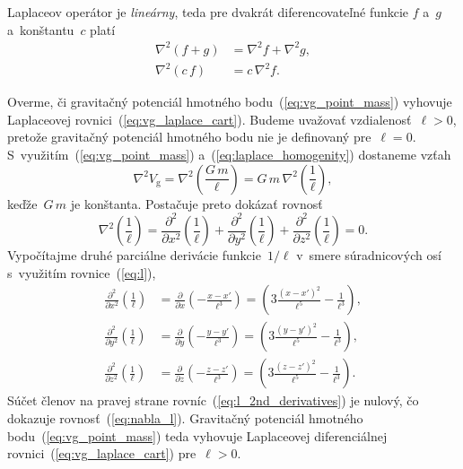 \documentclass[a4paper, 12pt]{book}
\newcommand{\gidx}{\mathrm g}
\begin{document}
Laplaceov operátor je \emph{lineárny}, teda pre dvakrát diferencovateľné 
funkcie $f$ a~$g$ a~konštantu~$c$ platí
%
\begin{align}
\label{eq:laplace_additivity}
\nabla^2 \left(f + g \right) &= \nabla^2 f + \nabla^2 g{,}\\
%
\label{eq:laplace_homogenity}
\nabla^2 (c \, f) &= c \, \nabla^2 f{.}
\end{align}

Overme, či gravitačný potenciál hmotného bodu~(\ref{eq:vg_point_mass}) vyhovuje 
Laplaceovej rovnici~(\ref{eq:vg_laplace_cart}).  Budeme uvažovať 
vzdialenosť~$\ell > 0$, pretože gravitačný potenciál hmotného bodu nie je 
definovaný pre~$\ell = 0$.  S~využitím~(\ref{eq:vg_point_mass}) 
a~(\ref{eq:laplace_homogenity}) dostaneme vzťah
%
\begin{equation}
\nabla^2 V_\gidx = \nabla^2 \left( \frac{G \, m}{\ell} \right) = G \, m \, 
\nabla^2 \left( \frac{1}{\ell} \right){,}
\end{equation}
%
keďže~$G \, m$ je konštanta.  Postačuje preto dokázať rovnosť
%
\begin{equation}
\label{eq:nabla_l}
\nabla^2 \left( \frac{1}{\ell} \right) = \frac{\partial^2}{\partial x^2}\left( 
\frac{1}{\ell} \right) + \frac{\partial^2}{\partial y^2}\left( \frac{1}{\ell} 
\right) + \frac{\partial^2}{\partial z^2}\left( \frac{1}{\ell} \right) = 0{.}
\end{equation}
%
Vypočítajme druhé parciálne derivácie funkcie~$1 \slash \ell$ v~smere 
súradnicových osí s~využitím rovnice~(\ref{eq:l}),
%
\begin{equation}
\label{eq:l_2nd_derivatives}
\begin{split}
\frac{\partial^2}{\partial x^2} \left( \frac{1}{\ell} \right) &=
\frac{\partial}{\partial x} \left( -\frac{x - x'}{\ell^3} \right) = \left(3
\frac{(x - x')^2}{\ell^5} - \frac{1}{\ell^3} \right){,}\\
%
\frac{\partial^2}{\partial y^2} \left( \frac{1}{\ell} \right) &=
\frac{\partial}{\partial y} \left( -\frac{y - y'}{\ell^3} \right) = \left(3
\frac{(y - y')^2}{\ell^5} - \frac{1}{\ell^3} \right){,}\\
%
\frac{\partial^2}{\partial z^2} \left( \frac{1}{\ell} \right) &=
\frac{\partial}{\partial z} \left( -\frac{z - z'}{\ell^3} \right) = \left(3
\frac{(z - z')^2}{\ell^5} - \frac{1}{\ell^3} \right){.}
\end{split}
\end{equation}
%
Súčet členov na pravej strane rovníc~(\ref{eq:l_2nd_derivatives}) je nulový, čo 
dokazuje rovnosť~(\ref{eq:nabla_l}).  Gravitačný potenciál hmotného 
bodu~(\ref{eq:vg_point_mass}) teda vyhovuje Laplaceovej diferenciálnej 
rovnici~(\ref{eq:vg_laplace_cart}) pre~$\ell > 0$.
\end{document}
